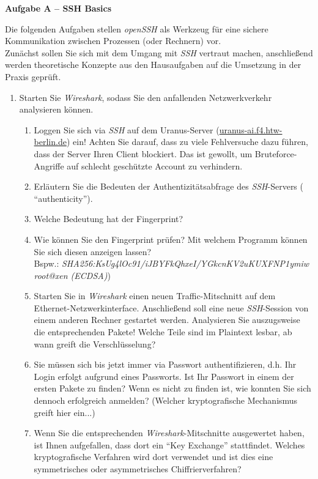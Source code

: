 \documentclass[paper=a4,fontsize=11pt]{scrartcl}%
\numberwithin{equation}{section}
\begin{document}
\begin{center}\Large{\textbf{Aufgabe A -- SSH Basics}}\end{center}\vskip0.25in
Die folgenden Aufgaben stellen \emph{openSSH} als Werkzeug für eine sichere Kommunikation zwischen Prozessen (oder Rechnern) vor.\\
Zunächst sollen Sie sich mit dem Umgang mit \emph{SSH} vertraut machen, anschließend werden theoretische Konzepte aus den Hausaufgaben auf die Umsetzung in der Praxis geprüft.
\begin{enumerate}
\item Starten Sie \emph{Wireshark}, sodass Sie den anfallenden Netzwerkverkehr analysieren können.
\begin{enumerate}
	\item Loggen Sie sich via \emph{SSH} auf dem Uranus-Server (\url{uranus-ai.f4.htw-berlin.de}) ein! Achten Sie darauf, dass zu viele Fehlversuche dazu führen, dass der Server Ihren Client blockiert. Das ist gewollt, um Bruteforce-Angriffe auf schlecht geschützte Account zu verhindern.
	\item Erläutern Sie die Bedeuten der Authentizitätsabfrage des \emph{SSH}-Servers ( \enquote{authenticity}).
	\item Welche Bedeutung hat der Fingerprint?
	\item Wie können Sie den Fingerprint prüfen? Mit welchem Programm können Sie sich diesen anzeigen lassen?\\
	Bspw.: \small{ \emph{SHA256:KsUg4lOc91/iJBYFkQhxeI/YGkcnKV2uKUXFNP1ymiw root@xen (ECDSA)}})
	\item Starten Sie in \emph{Wireshark} einen neuen Traffic-Mitschnitt auf dem Ethernet-Netzwerkinterface. Anschließend soll eine neue \emph{SSH}-Session von einem anderen Rechner gestartet werden. Analysieren Sie auszugsweise die entsprechenden Pakete! Welche Teile sind im Plaintext lesbar, ab wann greift die Verschlüsselung?
	\item Sie müssen sich bis jetzt immer via Passwort authentifizieren, d.h. Ihr Login erfolgt aufgrund eines Passworts. Ist Ihr Passwort in einem der ersten Pakete zu finden? Wenn es nicht zu finden ist, wie konnten Sie sich dennoch erfolgreich anmelden? (Welcher kryptografische Mechanismus greift hier ein...)
	\item Wenn Sie die entsprechenden \emph{Wireshark}-Mitschnitte ausgewertet haben, ist Ihnen aufgefallen, dass dort ein \enquote{Key Exchange} stattfindet. Welches kryptografische Verfahren wird dort verwendet und ist dies eine symmetrisches oder asymmetrisches Chiffrierverfahren?

\end{enumerate}
\end{enumerate}
\end{document}
